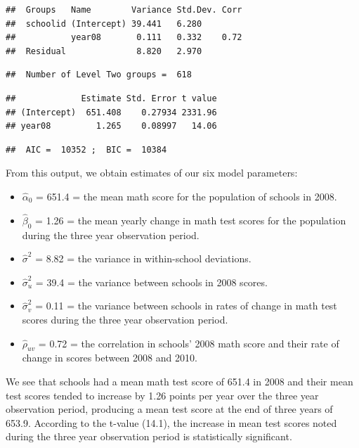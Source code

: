 \documentclass[
]{krantz}
\providecommand{\tightlist}{%
  \setlength{\itemsep}{0pt}\setlength{\parskip}{0pt}}
\begin{document}
\begin{verbatim}
##  Groups   Name        Variance Std.Dev. Corr
##  schoolid (Intercept) 39.441   6.280        
##           year08       0.111   0.332    0.72
##  Residual              8.820   2.970
\end{verbatim}

\begin{verbatim}
##  Number of Level Two groups =  618
\end{verbatim}

\begin{verbatim}
##             Estimate Std. Error t value
## (Intercept)  651.408    0.27934 2331.96
## year08         1.265    0.08997   14.06
\end{verbatim}

\begin{verbatim}
##  AIC =  10352 ;  BIC =  10384
\end{verbatim}

From this output, we obtain estimates of our six model parameters:

\begin{itemize}
\tightlist
\item
  \(\hat{\alpha}_{0}\) = 651.4 = the mean math score for the population of schools in 2008.
\item
  \(\hat{\beta}_{0}\) = 1.26 = the mean yearly change in math test scores for the population during the three year observation period.
\item
  \(\hat{\sigma}^2\) = 8.82 = the variance in within-school deviations.
\item
  \(\hat{\sigma}^2_u\) = 39.4 = the variance between schools in 2008 scores.
\item
  \(\hat{\sigma}^2_v\) = 0.11 = the variance between schools in rates of change in math test scores during the three year observation period.
\item
  \(\hat{\rho}_{uv}\) = 0.72 = the correlation in schools' 2008 math score and their rate of change in scores between 2008 and 2010.
\end{itemize}

We see that schools had a mean math test score of 651.4 in 2008 and their mean test scores tended to increase by 1.26 points per year over the three year observation period, producing a mean test score at the end of three years of 653.9. According to the t-value (14.1), the increase in mean test scores noted during the three year observation period is statistically significant.
\end{document}
